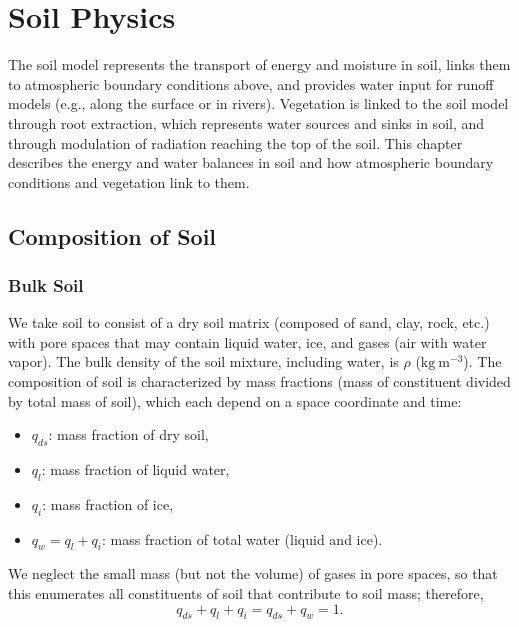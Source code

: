 \documentclass[twoside,10pt]{report}
\begin{document}
\chapter{Soil Physics}\label{c:soil}

The soil model represents the transport of energy and moisture in soil, links them to atmospheric boundary conditions above, and provides water input for runoff models (e.g., along the surface or in rivers). Vegetation is linked to the soil model through root extraction, which represents water sources and sinks in soil, and through modulation of radiation reaching the top of the soil.  This chapter describes the energy and water balances in soil and how atmospheric boundary conditions and vegetation link to them.

\section{Composition of Soil}

\subsection{Bulk Soil}

We take soil to consist of a dry soil matrix (composed of sand, clay, rock, etc.) with pore spaces that may contain liquid water, ice, and gases (air with water vapor). The bulk density of the soil mixture, including water, is $\rho$ ($\mathrm{kg~m^{-3}}$). The composition of soil is characterized by mass fractions (mass of constituent divided by total mass of soil), which each depend on a space coordinate and time:
\begin{itemize}
    \item $q_{ds}$: mass fraction of dry soil,
    \item $q_l$: mass fraction of liquid water,
    \item $q_i$: mass fraction of ice,
    \item $q_w = q_l + q_i$: mass fraction of total water (liquid and ice).
\end{itemize}
We neglect the small mass (but not the volume) of gases in pore spaces, so that this enumerates all constituents of soil that contribute to soil mass; therefore, 
\[
q_{ds} + q_l + q_i = q_{ds} + q_w = 1.
\]
\end{document}
